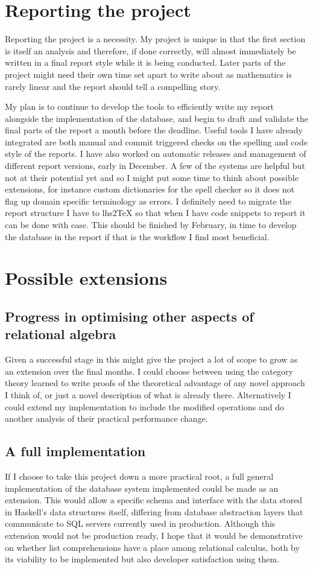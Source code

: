 \section{Reporting the project}
Reporting the project is a necessity. My project is unique in that the first section is itself an analysis and therefore, if done correctly, will almost immediately be written in a final report style while it is being conducted. Later parts of the project might need their own time set apart to write about as mathematics is rarely linear and the report should tell a compelling story.

My plan is to continue to develop the tools to efficiently write my report alongside the implementation of the database, and begin to draft and validate the final parts of the report a month before the deadline. Useful tools I have already integrated are both manual and commit triggered checks on the spelling and code style of the reports. I have also worked on automatic releases and management of different report versions, early in December. A few of the systems are helpful but not at their potential yet and so I might put some time to think about possible extensions, for instance custom dictionaries for the spell checker so it does not flag up domain specific terminology as errors. I definitely need to migrate the report structure I have to lhs2\TeX{} so that when I have code snippets to report it can be done with ease. This should be finished by February, in time to develop the database in the report if that is the workflow I find most beneficial.
\section{Possible extensions}
\subsection{Progress in optimising other aspects of relational algebra}
Given a successful stage in  this might give the project a lot of scope to grow as an extension over the final months. I could choose between using the category theory learned to write proofs of the theoretical advantage of any novel approach I think of, or just a novel description of what is already there. Alternatively I could extend my implementation to include the modified operations and do another analysis of their practical performance change.
\subsection{A full implementation}
If I choose to take this project down a more practical root, a full general implementation of the database system implemented could be made as an extension. This would allow a specific schema and interface with the data stored in Haskell's data structures itself, differing from database abstraction layers that communicate to SQL servers currently used in production.\cite{HDBC} Although this extension would not be production ready, I hope that it would be demonstrative on whether list comprehensions have a place among relational calculus, both by its viability to be implemented but also developer satisfaction using them.
